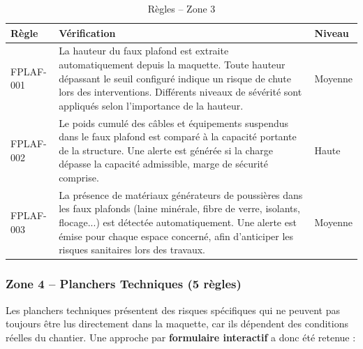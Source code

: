 \documentclass[a4paper,12pt]{article}
\begin{document}
\begin{table}[h!]
\centering
\begin{tabular}{p{1.8cm}p{9.5cm}p{2cm}}
\toprule
\textbf{Règle} & \textbf{Vérification} & \textbf{Niveau} \\
\midrule
FPLAF-001 & La hauteur du faux plafond est extraite automatiquement depuis la maquette. Toute hauteur dépassant le seuil configuré indique un risque de chute lors des interventions. Différents niveaux de sévérité sont appliqués selon l'importance de la hauteur. & Moyenne \\[0.5em]
FPLAF-002 & Le poids cumulé des câbles et équipements suspendus dans le faux plafond est comparé à la capacité portante de la structure. Une alerte est générée si la charge dépasse la capacité admissible, marge de sécurité comprise. & Haute \\[0.5em]
FPLAF-003 & La présence de matériaux générateurs de poussières dans les faux plafonds (laine minérale, fibre de verre, isolants, flocage...) est détectée automatiquement. Une alerte est émise pour chaque espace concerné, afin d'anticiper les risques sanitaires lors des travaux. & Moyenne \\
\bottomrule
\end{tabular}
\caption{Règles -- Zone 3}
\end{table}

\subsubsection*{Zone 4 -- Planchers Techniques (5 règles)}

Les planchers techniques présentent des risques spécifiques qui ne peuvent pas toujours être lus directement dans la maquette, car ils dépendent des conditions réelles du chantier. Une approche par \textbf{formulaire interactif} a donc été retenue :
\end{document}
